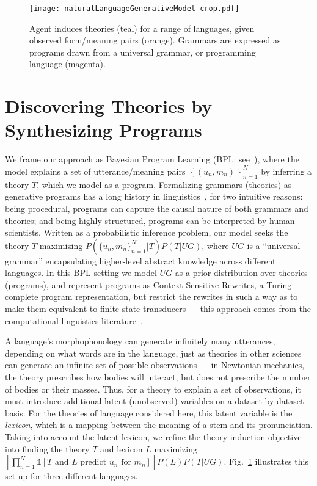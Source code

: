 \documentclass[12pt]{article}
\newcommand{\indicator}{\mathds{1}} %
\begin{document}
\begin{figure}
  \texttt{[image: naturalLanguageGenerativeModel-crop.pdf]}
  \caption{Agent induces theories (teal) for a range of languages, given observed form/meaning pairs (orange). Grammars are expressed as programs drawn from a universal grammar, or programming language (magenta). }\label{generativeModel}
  \end{figure}







\section*{Discovering Theories by Synthesizing Programs} 

We frame our approach as Bayesian Program Learning (BPL:
see~\cite{lake2015human}), where the model explains a set of
utterance/meaning pairs $\left\{(u_n,m_n) \right\}_{n = 1}^N$ by
inferring a theory $T$, which we model as a program.  Formalizing
grammars (theories) as generative programs has a long history in
linguistics~\cite{chomsky1968sound},
for two intuitive reasons: being procedural,
programs can capture the causal nature of
both grammars and theories;
and being highly structured,
programs can be interpreted by human scientists.
Written as a probabilistic
inference problem, our model seeks the theory $T$ maximizing
$P(\{u_n,m_n\}_{n = 1}^N | T)P(T|UG)$, where $UG$ is a ``universal
grammar'' encapsulating  higher-level abstract knowledge across
different languages.  In this BPL setting we model $UG$ as a prior
distribution over theories (programs), and represent programs as
Context-Sensitive Rewrites, a Turing-complete program representation,
but restrict the rewrites in such a way as to make them equivalent to
finite state transducers --- this approach comes from the computational
linguistics literature~\cite{beesley2003finite}.

A language's morphophonology can generate infinitely many
utterances,
depending on what words are in the language,
just as theories in other sciences
can generate an infinite set of
possible observations --- in Newtonian mechanics,
the theory prescribes
how bodies will interact,
but does not prescribe
the number of bodies or their masses.
Thus, for a theory to explain a set of observations,
it must introduce additional latent (unobserved)
variables on a dataset-by-dataset basis.
For the theories of language considered here,
this latent variable is the \emph{lexicon},
which is a mapping between
the meaning of a stem and its pronunciation.
Taking into account the latent lexicon,
we refine the theory-induction objective into
finding the theory $T$ and lexicon $L$ maximizing
$\left[\prod_{n = 1}^N \indicator[T\text{ and }L\text{ predict }u_n\text{ for }m_n] \right]P(L)P(T|UG)$.
Fig.~\ref{generativeModel} illustrates this set up for three different languages.
\end{document}
